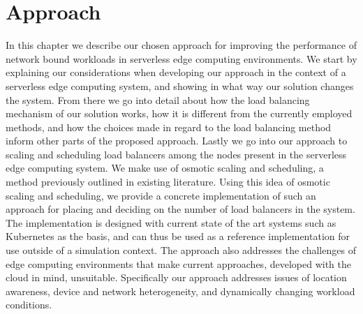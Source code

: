 \chapter{Approach}
In this chapter we describe our chosen approach for improving the performance of network bound workloads in serverless edge computing environments. We start by explaining our considerations when developing our approach in the context of a serverless edge computing system, and showing in what way our solution changes the system. From there we go into detail about how the load balancing mechanism of our solution works, how it is different from the currently employed methods, and how the choices made in regard to the load balancing method inform other parts of the proposed approach.
Lastly we go into our approach to scaling and scheduling load balancers among the nodes present in the serverless edge computing system. We make use of osmotic scaling and scheduling, a method previously outlined in existing literature. Using this idea of osmotic scaling and scheduling, we provide a concrete implementation of such an approach for placing and deciding on the number of load balancers in the system. The implementation is designed with current state of the art systems such as Kubernetes as the basis, and can thus be used as a reference implementation for use outside of a simulation context. The approach also addresses the challenges of edge computing environments that make current approaches, developed with the cloud in mind, unsuitable. Specifically our approach addresses issues of location awareness, device and network heterogeneity, and dynamically changing workload conditions.


